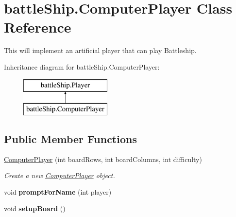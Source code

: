 \hypertarget{classbattleShip_1_1ComputerPlayer}{\section{battle\-Ship.\-Computer\-Player Class Reference}
\label{classbattleShip_1_1ComputerPlayer}
}


This will implement an artificial player that can play Battleship.  


Inheritance diagram for battle\-Ship.\-Computer\-Player\-:\begin{figure}[H]
\begin{center}
\leavevmode
\includegraphics[height=2.000000cm]{classbattleShip_1_1ComputerPlayer}
\end{center}
\end{figure}
\subsection*{Public Member Functions}
\begin{DoxyCompactItemize}
\item 
\hyperlink{classbattleShip_1_1ComputerPlayer_a9158aa4d5add20abead9202ce3ef0ff2}{Computer\-Player} (int board\-Rows, int board\-Columns, int difficulty)
\begin{DoxyCompactList}\small\item\em Create a new \hyperlink{classbattleShip_1_1ComputerPlayer}{Computer\-Player} object. \end{DoxyCompactList}\item 
\hypertarget{classbattleShip_1_1ComputerPlayer_a23903e61dcd8593a21b24770e089dedf}{void {\bfseries prompt\-For\-Name} (int player)}\label{classbattleShip_1_1ComputerPlayer_a23903e61dcd8593a21b24770e089dedf}

\item 
\hypertarget{classbattleShip_1_1ComputerPlayer_a9d14fb18c9e81498a5c77b215d169642}{void {\bfseries setup\-Board} ()}\label{classbattleShip_1_1ComputerPlayer_a9d14fb18c9e81498a5c77b215d169642}

\end{DoxyCompactItemize}
